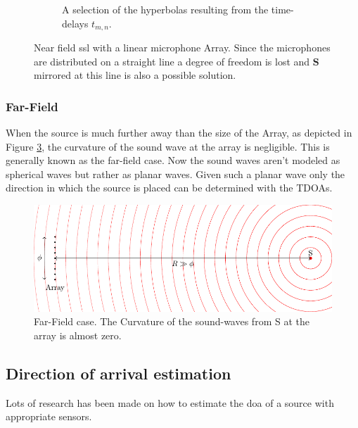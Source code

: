 \begin{figure}[h]
\begin{subfigure}[b]{0.45\textwidth}
    \caption{A selection of the hyperbolas resulting from the time-delays $t_{m,n}$.}
    \label{ssl:fig:hyperbola}
  \end{subfigure}
  \caption{Near field \acrshort{ssl} with a linear microphone Array. 
  Since the microphones are distributed on a straight line a degree of freedom is lost and
  $\bm{S}$ mirrored at this line is also a possible solution.}
  \label{fig:three graphs}
\end{figure}

\subsubsection{Far-Field}
When the source is much further away than the size of the Array, as depicted
in Figure \ref{ssl:fig:far field}, the curvature of the sound wave at the array is negligible.
This is generally known as the far-field case.
Now the sound waves aren't modeled as spherical waves but rather as planar waves.
Given such a planar wave only the direction in which the source is placed can be determined with the TDOAs.


\begin{figure}
  \centering
  \includegraphics[]{FarField.pdf}
  \caption{Far-Field case. The Curvature of the sound-waves from S at the array
  is almost zero.}
  \label{ssl:fig:far field}
\end{figure}

\subsection{Direction of arrival estimation}
Lots of research has been made on how to estimate the \acrfull*{doa} of a source
with appropriate sensors.



